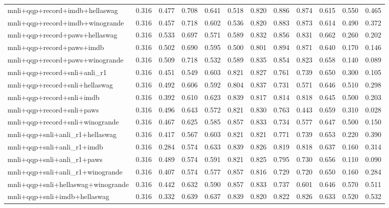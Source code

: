 \begin{table}[t]
\begin{tabular}{lrrrrrrrrrrr}
    mnli+qqp+record+imdb+hellaswag & 0.316 & 0.477 & 0.708 & 0.641 & 0.518 & 0.820 & 0.886 & 0.874 & 0.615 & 0.550 & 0.465 \\
    mnli+qqp+record+imdb+winogrande & 0.316 & 0.457 & 0.718 & 0.602 & 0.536 & 0.820 & 0.883 & 0.873 & 0.614 & 0.490 & 0.372 \\
    mnli+qqp+record+paws+hellaswag & 0.316 & 0.533 & 0.697 & 0.571 & 0.589 & 0.832 & 0.856 & 0.831 & 0.662 & 0.260 & 0.202 \\
    mnli+qqp+record+paws+imdb & 0.316 & 0.502 & 0.690 & 0.595 & 0.500 & 0.801 & 0.894 & 0.871 & 0.640 & 0.170 & 0.146 \\
    mnli+qqp+record+paws+winogrande & 0.316 & 0.509 & 0.718 & 0.532 & 0.589 & 0.835 & 0.854 & 0.823 & 0.658 & 0.140 & 0.089 \\
    mnli+qqp+record+snli+anli\_r1 & 0.316 & 0.451 & 0.549 & 0.603 & 0.821 & 0.827 & 0.761 & 0.739 & 0.650 & 0.300 & 0.105 \\
    mnli+qqp+record+snli+hellaswag & 0.316 & 0.492 & 0.606 & 0.592 & 0.804 & 0.837 & 0.731 & 0.571 & 0.646 & 0.510 & 0.298 \\
    mnli+qqp+record+snli+imdb & 0.316 & 0.392 & 0.610 & 0.623 & 0.839 & 0.817 & 0.814 & 0.818 & 0.645 & 0.500 & 0.203 \\
    mnli+qqp+record+snli+paws & 0.316 & 0.496 & 0.643 & 0.572 & 0.821 & 0.830 & 0.763 & 0.443 & 0.659 & 0.310 & 0.028 \\
    mnli+qqp+record+snli+winogrande & 0.316 & 0.467 & 0.625 & 0.585 & 0.857 & 0.833 & 0.734 & 0.577 & 0.647 & 0.500 & 0.150 \\
    mnli+qqp+snli+anli\_r1+hellaswag & 0.316 & 0.417 & 0.567 & 0.603 & 0.821 & 0.821 & 0.771 & 0.739 & 0.653 & 0.220 & 0.390 \\
    mnli+qqp+snli+anli\_r1+imdb & 0.316 & 0.284 & 0.574 & 0.633 & 0.839 & 0.826 & 0.819 & 0.818 & 0.637 & 0.160 & 0.314 \\
    mnli+qqp+snli+anli\_r1+paws & 0.316 & 0.489 & 0.574 & 0.591 & 0.821 & 0.825 & 0.795 & 0.730 & 0.656 & 0.110 & 0.090 \\
    mnli+qqp+snli+anli\_r1+winogrande & 0.316 & 0.407 & 0.574 & 0.577 & 0.857 & 0.816 & 0.729 & 0.720 & 0.650 & 0.160 & 0.284 \\
    mnli+qqp+snli+hellaswag+winogrande & 0.316 & 0.442 & 0.632 & 0.590 & 0.857 & 0.833 & 0.737 & 0.601 & 0.646 & 0.570 & 0.511 \\
    mnli+qqp+snli+imdb+hellaswag & 0.316 & 0.332 & 0.639 & 0.637 & 0.839 & 0.820 & 0.822 & 0.826 & 0.633 & 0.520 & 0.532 \\

\end{tabular}
\end{table}
